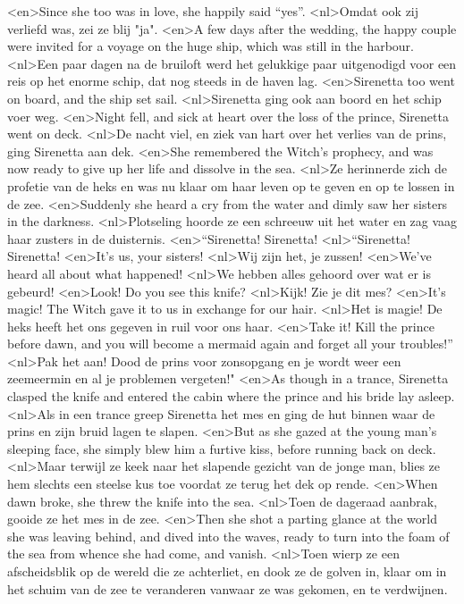 <en>Since she too was in love, she happily said “yes”.
<nl>Omdat ook zij verliefd was, zei ze blij "ja".
<en>A few days after the wedding, the happy couple were invited for a voyage on the huge ship, which was still in the harbour.
<nl>Een paar dagen na de bruiloft werd het gelukkige paar uitgenodigd voor een reis op het enorme schip, dat nog steeds in de haven lag.
<en>Sirenetta too went on board, and the ship set sail.
<nl>Sirenetta ging ook aan boord en het schip voer weg.
<en>Night fell, and sick at heart over the loss of the prince, Sirenetta went on deck.
<nl>De nacht viel, en ziek van hart over het verlies van de prins, ging Sirenetta aan dek.
<en>She remembered the Witch’s prophecy, and was now ready to give up her life and dissolve in the sea.
<nl>Ze herinnerde zich de profetie van de heks en was nu klaar om haar leven op te geven en op te lossen in de zee.
<en>Suddenly she heard a cry from the water and dimly saw her sisters in the darkness.
<nl>Plotseling hoorde ze een schreeuw uit het water en zag vaag  haar zusters  in de duisternis.
<en>“Sirenetta! Sirenetta!
<nl>“Sirenetta! Sirenetta!
<en>It’s us, your sisters!
<nl>Wij zijn het, je zussen!
<en>We’ve heard all about what happened!
<nl>We hebben alles gehoord over wat er is gebeurd!
<en>Look! Do you see this knife?
<nl>Kijk! Zie je dit mes?
<en>It’s magic! The Witch gave it to us in exchange for our hair.
<nl>Het is magie! De heks heeft het ons gegeven in ruil voor ons haar.
<en>Take it! Kill the prince before dawn, and you will become a mermaid again and forget all your troubles!”
<nl>Pak het aan! Dood de prins voor zonsopgang en je wordt weer een zeemeermin en  al je problemen vergeten!"
<en>As though in a trance, Sirenetta clasped the knife and entered the cabin where the prince and his bride lay asleep.
<nl>Als in een trance greep Sirenetta het mes en ging de hut binnen waar de prins en zijn bruid lagen te slapen.
<en>But as she gazed at the young man’s sleeping face, she simply blew him a furtive kiss, before running back on deck.
<nl>Maar terwijl ze keek naar het slapende gezicht van de jonge man, blies ze hem slechts  een steelse kus toe voordat ze terug het  dek op rende.
<en>When dawn broke, she threw the knife into the sea.
<nl>Toen de dageraad aanbrak, gooide ze het mes in de zee.
<en>Then she shot a parting glance at the world she was leaving behind, and dived into the waves, ready to turn into the foam of the sea from whence she had come, and vanish.
<nl>Toen wierp ze een afscheidsblik op de wereld die ze achterliet, en dook ze de golven in, klaar om in het schuim van de zee te veranderen vanwaar ze was gekomen, en te verdwijnen.
